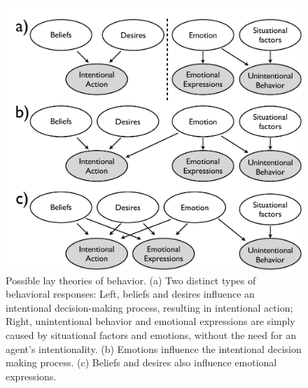 \documentclass[10pt,letterpaper]{article}
\begin{document}




\begin{figure}[htb!]
\begin{center}
\includegraphics[width=1\columnwidth]{images/model1.pdf} 
\end{center}
\caption{ Possible lay theories of behavior. (a) Two distinct types of behavioral responses: Left, beliefs and desires influence an intentional decision-making process, resulting in intentional action; Right, unintentional behavior and emotional expressions are simply caused by situational factors and emotions, without the need for an agent's intentionality. (b) Emotions influence the intentional decision making process. (c) Beliefs and desires also influence emotional expressions. }
\label{ModelsOfBehaviorFig}
\end{figure}
\end{document}
